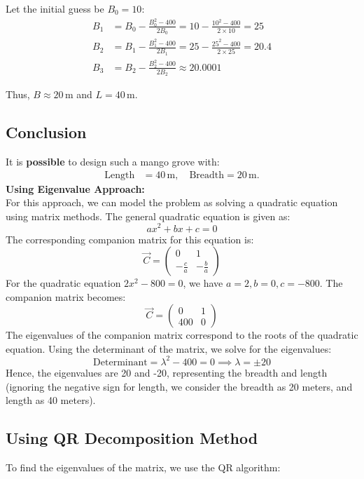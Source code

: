 \documentclass[journal]{IEEEtran}
\begin{document}
Let the initial guess be \( B_0 = 10 \):
\begin{align}
    B_1 &= B_0 - \frac{B_0^2 - 400}{2B_0} = 10 - \frac{10^2 - 400}{2 \times 10} = 25 \\
    B_2 &= B_1 - \frac{B_1^2 - 400}{2B_1} = 25 - \frac{25^2 - 400}{2 \times 25} = 20.4 \\
    B_3 &= B_2 - \frac{B_2^2 - 400}{2B_2} \approx 20.0001
\end{align}

Thus, \( B \approx 20 \, \text{m} \) and \( L = 40 \, \text{m} \).

\subsection*{Conclusion}
It is \textbf{possible} to design such a mango grove with:
\begin{align}
    \text{Length} &= 40 \, \text{m}, \quad \text{Breadth} = 20 \, \text{m}.
\end{align}
\textbf{Using Eigenvalue Approach:} \\
    For this approach, we can model the problem as solving a quadratic equation using matrix methods. The general quadratic equation is given as:
    \[
    ax^2 + bx + c = 0
    \]
    The corresponding companion matrix for this equation is:
    \[
    \vec{C} = \begin{pmatrix} 0 & 1 \\ -\frac{c}{a} & -\frac{b}{a} \end{pmatrix}
    \]
    For the quadratic equation \( 2x^2 - 800 = 0 \), we have \( a = 2, b = 0, c = -800 \). The companion matrix becomes:
    \[
    \vec{C} = \begin{pmatrix} 0 & 1 \\ 400 & 0 \end{pmatrix}
    \]
    The eigenvalues of the companion matrix correspond to the roots of the quadratic equation. Using the determinant of the matrix, we solve for the eigenvalues:
    \[
    \text{Determinant} = \lambda^2 - 400 = 0 \implies \lambda = \pm 20
    \]
    Hence, the eigenvalues are 20 and -20, representing the breadth and length (ignoring the negative sign for length, we consider the breadth as 20 meters, and length as 40 meters).
    
\subsection*{Using QR Decomposition Method}
To find the eigenvalues of the matrix, we use the QR algorithm:
\end{document}
